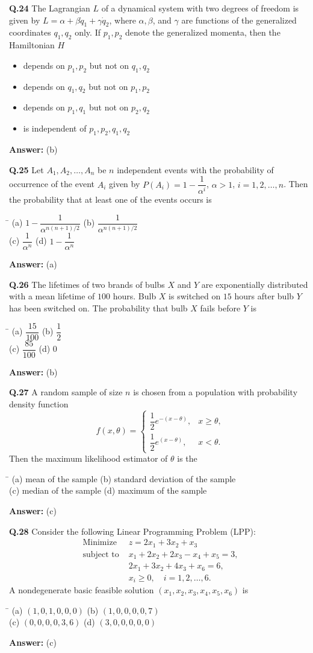 \documentclass[11pt,a4paper]{article}
\newcommand{\optsfour}[4]{%
  \begin{tabbing}
    \hspace{0.48\linewidth}\=\kill
    (a) #1 \> (b) #2 \\[2pt]
    (c) #3 \> (d) #4
  \end{tabbing}%
}
\newcommand{\optslist}[4]{%
  \begin{itemize}
    \setlength{\itemsep}{2pt}\setlength{\parskip}{0pt}
    \item[(a)] #1
    \item[(b)] #2
    \item[(c)] #3
    \item[(d)] #4
  \end{itemize}%
}
\newcommand{\ans}[1]{\textbf{Answer:} #1\par\medskip}
\begin{document}
\textbf{Q.24} The Lagrangian $L$ of a dynamical system with two degrees of freedom is given by $L = \alpha + \beta\dot{q}_1 + \gamma\dot{q}_2$, where $\alpha, \beta$, and $\gamma$ are functions of the generalized coordinates $q_1, q_2$ only. If $p_1, p_2$ denote the generalized momenta, then the Hamiltonian $H$
\optslist{depends on $p_1, p_2$ but not on $q_1, q_2$}{depends on $q_1, q_2$ but not on $p_1, p_2$}{depends on $p_1, q_1$ but not on $p_2, q_2$}{is independent of $p_1, p_2, q_1, q_2$}
\ans{(b)}

\textbf{Q.25} Let $A_1, A_2, \dots, A_n$ be $n$ independent events with the probability of occurrence of the event $A_i$ given by $P(A_i) = 1 - \dfrac{1}{\alpha^i}$, $\alpha > 1$, $i = 1, 2, \dots, n$. Then the probability that at least one of the events occurs is
\optsfour{$1 - \dfrac{1}{\alpha^{n(n+1)/2}}$}{$\dfrac{1}{\alpha^{n(n+1)/2}}$}{$\dfrac{1}{\alpha^n}$}{$1 - \dfrac{1}{\alpha^n}$}
\ans{(a)}

\textbf{Q.26} The lifetimes of two brands of bulbs $X$ and $Y$ are exponentially distributed with a mean lifetime of $100$ hours. Bulb $X$ is switched on $15$ hours after bulb $Y$ has been switched on. The probability that bulb $X$ fails before $Y$ is
\optsfour{$\dfrac{15}{100}$}{$\dfrac{1}{2}$}{$\dfrac{85}{100}$}{$0$}
\ans{(b)}

\textbf{Q.27} A random sample of size $n$ is chosen from a population with probability density function
\[
  f(x, \theta) = \begin{cases} \dfrac{1}{2}e^{-(x - \theta)}, & x \ge \theta, \\ \dfrac{1}{2}e^{(x - \theta)}, & x < \theta. \end{cases}
\]
Then the maximum likelihood estimator of $\theta$ is the
\optsfour{mean of the sample}{standard deviation of the sample}{median of the sample}{maximum of the sample}
\ans{(c)}

\textbf{Q.28} Consider the following Linear Programming Problem (LPP):
\begin{align*}
  \text{Minimize } & z = 2x_1 + 3x_2 + x_3 \\
  \text{subject to } & x_1 + 2x_2 + 2x_3 - x_4 + x_5 = 3, \\
                     & 2x_1 + 3x_2 + 4x_3 + x_6 = 6, \\
                     & x_i \ge 0, \quad i = 1, 2, \dots, 6.
\end{align*}
A nondegenerate basic feasible solution $(x_1, x_2, x_3, x_4, x_5, x_6)$ is
\optsfour{$(1, 0, 1, 0, 0, 0)$}{$(1, 0, 0, 0, 0, 7)$}{$(0, 0, 0, 0, 3, 6)$}{$(3, 0, 0, 0, 0, 0)$}
\ans{(c)}
\end{document}
